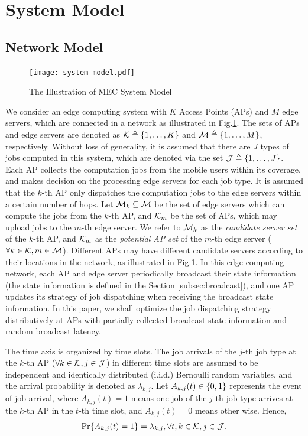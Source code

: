 \section{System Model}
\label{sec:model}
\subsection{Network Model}
\begin{figure}[htp!]
    \centering
    \texttt{[image: system-model.pdf]}
    \caption{The Illustration of MEC System Model}
    \label{fig:system}
\end{figure}

We consider an edge computing system with $K$ Access Points (APs) and $M$ edge servers, which are connected in a network as illustrated in Fig.\ref{fig:system}.
The sets of APs and edge servers are denoted as $\mathcal{K} \triangleq \{1,\dots,K\}$ and $\mathcal{M} \triangleq \{1,\dots,M\}$, respectively.
Without loss of generality, it is assumed that there are $J$ types of jobs computed in this system, which are denoted via the set $\mathcal{J} \triangleq \{1,\dots,J\}$.
Each AP collects the computation jobs from the mobile users within its coverage, and makes decision on the processing edge servers for each job type.
It is assumed that the $k$-th AP only dispatches the computation jobs to the edge servers within a certain number of hops.
Let $\mathcal{M}_{k} \subseteq \mathcal{M}$ be the set of edge servers which can compute the jobs from the $k$-th AP, and $\mathcal{K}_{m}$ be the set of APs, which may upload jobs to the $m$-th edge server.
We refer to $\mathcal{M}_{k}$ as the \emph{candidate server set} of the $k$-th AP, and $\mathcal{K}_{m}$ as the \emph{potential AP set} of the $m$-th edge server ($\forall k\in\mathcal{K}, m\in\mathcal{M}$).
Different APs may have different candidate servers according to their locations in the network, as illustrated in Fig.\ref{fig:system}.
In this edge computing network, each AP and edge server periodically broadcast their state information (the state information is defined in the Section \ref{subsec:broadcast}), and one AP updates its strategy of job dispatching when receiving the broadcast state information.
In this paper, we shall optimize the job dispatching strategy distributively at APs with partially collected broadcast state information and random broadcast latency.

The time axis is organized by time slots.
The job arrivals of the $j$-th job type at the $k$-th AP ($\forall k\in\mathcal{K},j\in\mathcal{J}$) in different time slots are assumed to be independent and identically distributed (i.i.d.) Bernoulli random variables, and the arrival probability is denoted as $\lambda_{k,j}$.
Let $A_{k,j}(t) \in \{0,1\}$ represents the event of job arrival, where $A_{k,j}(t)=1$ means one job of the $j$-th job type arrives at the $k$-th AP in the $t$-th time slot, and $A_{k,j}(t)=0$ means other wise.
Hence,
\begin{align}
    \Pr\{ A_{k,j}(t) = 1 \} = \lambda_{k,j}, \forall t,k\in\mathcal{K},j\in\mathcal{J}.
\end{align}

